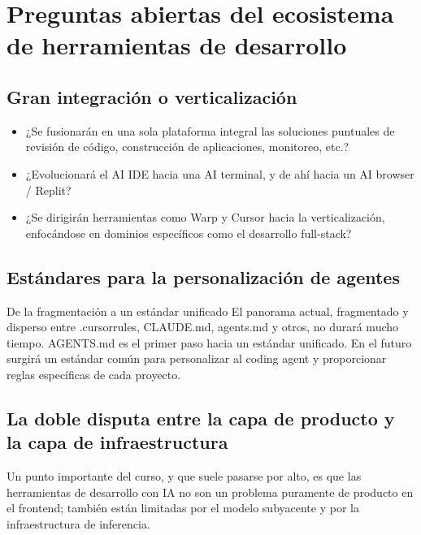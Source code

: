 \section{Preguntas abiertas del ecosistema de herramientas de desarrollo}

\subsection{Gran integración o verticalización}

\begin{itemize}
    \item ¿Se fusionarán en una sola plataforma integral las soluciones puntuales de revisión de código, construcción de aplicaciones, monitoreo, etc.?
    \item ¿Evolucionará el AI IDE hacia una AI terminal, y de ahí hacia un AI browser / Replit?
    \item ¿Se dirigirán herramientas como Warp y Cursor hacia la verticalización, enfocándose en dominios específicos como el desarrollo full-stack?
\end{itemize}

\subsection{Estándares para la personalización de agentes}

\begin{importantbox}{De la fragmentación a un estándar unificado}
El panorama actual, fragmentado y disperso entre .cursorrules, CLAUDE.md, agents.md y otros, no durará mucho tiempo. AGENTS.md es el primer paso hacia un estándar unificado. En el futuro surgirá un estándar común para personalizar al coding agent y proporcionar reglas específicas de cada proyecto.
\end{importantbox}

\subsection{La doble disputa entre la capa de producto y la capa de infraestructura}

Un punto importante del curso, y que suele pasarse por alto, es que las herramientas de desarrollo con IA no son un problema puramente de producto en el frontend; también están limitadas por el modelo subyacente y por la infraestructura de inferencia.

